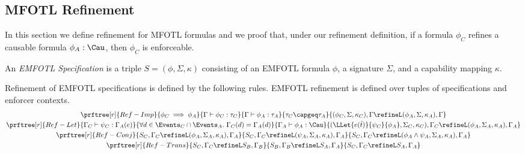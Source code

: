 \subsection{MFOTL Refinement}
\label{subsection:refinement-of-mfotl-specifications}

In this section we define refinement for MFOTL formulas and we proof
that, under our refinement definition,
if a formula $\phi_C$ refines a causable formula $\phi_A : \Cau$,
then $\phi_C$ is enforceable.

\begin{definition}
    \label{def:enforceable-mfotl-specification}
    An \emph{EMFOTL Specification} is a triple
    $S = (\phi, \Sigma, \kappa)$ consisting of an EMFOTL formula $\phi$,
    a signature $\Sigma$, and a capability mapping $\kappa$.
\end{definition}

\begin{definition}
    \label{def:mfotl-refinement}
    Refinement of EMFOTL specifications is defined by the following rules.
    EMFOTL refinement is defined over tuples of specifications and enforcer contexts.
    \begin{gather*}
        \prftree[r]{Ref-Imp}
            {\phi_C \implies \phi_A}
            {\Gamma \vdash \phi_C : \tau_C}
            {\Gamma \vdash \phi_A : \tau_A}
            {\tau_C \capgeq \tau_A}
            {(\phi_C, \Sigma, \kappa_C), \Gamma \refineL (\phi_A, \Sigma, \kappa_A), \Gamma} \\
        \prftree[r]{Ref-Let}
            {\Gamma_C \vdash \psi_C : \Gamma_A(e)}
            {\forall d \in \Events_C \cap \Events_A .~ \Gamma_C(d) = \Gamma_A(d)}
            {\Gamma_A \vdash \phi_A : \Cau} %
            {(\LLet{e(\bar{t})}{\psi_C}{\phi_A}, \Sigma_C, \kappa_C), \Gamma_C
                \refineL (\phi_A, \Sigma_A, \kappa_A), \Gamma_A} \\
        \prftree[r]{Ref-Conj}
            {S_C, \Gamma_C \refineL (\phi_A, \Sigma_A, \kappa_A), \Gamma_A}
            {S_C, \Gamma_C \refineL (\psi_A, \Sigma_A, \kappa_A), \Gamma_A}
            {S_C, \Gamma_C \refineL (\phi_A \wedge \psi_A, \Sigma_A, \kappa_A), \Gamma_A} \\
        \prftree[r]{Ref-Trans}
            {S_C, \Gamma_C \refineL S_B, \Gamma_B}
            {S_B, \Gamma_B \refineL S_A, \Gamma_A}
            {S_C, \Gamma_C \refineL S_A, \Gamma_A}
    \end{gather*}
\end{definition}


